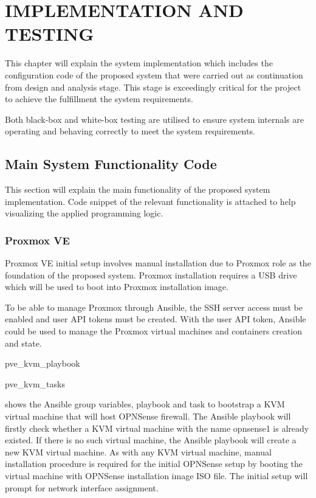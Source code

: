 \documentclass[../index.tex]{subfiles}
\begin{document}
\chapter{IMPLEMENTATION AND TESTING}

This chapter will explain the system implementation which includes the configuration code of the
proposed system that were carried out as continuation from design and analysis stage. This stage is
exceedingly critical for the project to achieve the fulfillment the system requirements. 

Both black-box and white-box testing are utilised to ensure system internals are operating and
behaving correctly to meet the system requirements.

\section{Main System Functionality Code}

This section will explain the main functionality of the proposed system implementation. Code snippet
of the relevant functionality is attached to help visualizing the applied programming logic.

\subsection{Proxmox VE}

Proxmox VE initial setup involves manual installation due to Proxmox role as the foundation of the
proposed system. Proxmox installation requires a USB drive which will be used to boot into Proxmox
installation image.

To be able to manage Proxmox through Ansible, the SSH server access must be enabled and user API
tokens must be created. With the user API token, Ansible could be used to manage the Proxmox virtual
machines and containers creation and state.

{pve_kvm_playbook}

{pve_kvm_tasks}

 shows the Ansible group variables, playbook and task
to bootstrap a KVM virtual machine that will host OPNSense firewall. The Ansible playbook will
firstly check whether a KVM virtual machine with the name opnsense1 is already existed. If there is
no such virtual machine, the Ansible playbook will create a new KVM virtual machine. As with any KVM
virtual machine, manual installation procedure is required for the initial OPNSense setup by booting
the virtual machine with OPNSense installation image ISO file. The initial setup will prompt for
network interface assignment.
\end{document}

